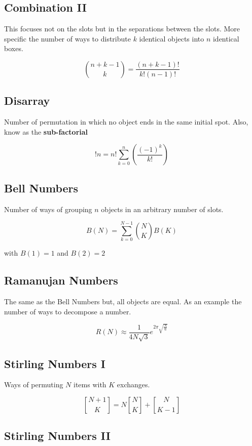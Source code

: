 \subsection{Combination II}

This focuses not on the slots but in the separations between the slots.
More specific the number of ways to distribute \(k\) identical objects into \(n\) identical boxes. 

\[\binom{n + k - 1}{k} = \frac{(n + k - 1)!}{k!(n - 1)!}\]

\subsection{Disarray}

Number of permutation in which no object ends in the same initial spot. Also, know as the \textbf{sub-factorial}

\[!n = n! \sum_{k = 0}^{n} \left(\frac{{(-1)}^k}{k!}\right)\]

\subsection{Bell Numbers}

Number of ways of grouping \(n\) objects in an arbitrary number of slots.

\[B(N) = \sum_{k = 0}^{N-1}\binom{N}{K}B(K)\]

with \(B(1) = 1\) and \(B(2) = 2\)

\subsection{Ramanujan Numbers}

The same as the Bell Numbers but, all objects are equal. As an example the number of ways
to decompose a number.

\[R(N) \approx \frac{1}{4N\sqrt{3}} e^{2\pi \sqrt{\frac{N}{6}}}\]

\subsection{Stirling Numbers I}

Ways of permuting \(N\) items with \(K\) exchanges.

\[
\genfrac{[}{]}{0pt}{}{N + 1}{K} = N \genfrac{[}{]}{0pt}{}{N}{K} + \genfrac{[}{]}{0pt}{}{N}{K - 1}
\]


\subsection{Stirling Numbers II}


